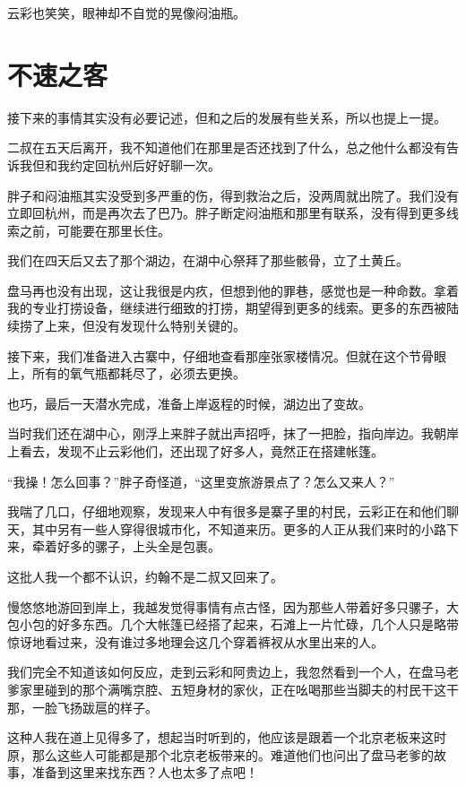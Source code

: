 云彩也笑笑，眼神却不自觉的晃像闷油瓶。

\chapter{不速之客}

接下来的事情其实没有必要记述，但和之后的发展有些关系，所以也提上一提。

二叔在五天后离开，我不知道他们在那里是否还找到了什么，总之他什么都没有告诉我但和我约定回杭州后好好聊一次。

胖子和闷油瓶其实没受到多严重的伤，得到救治之后，没两周就出院了。我们没有立即回杭州，而是再次去了巴乃。胖子断定闷油瓶和那里有联系，没有得到更多线索之前，可能要在那里长住。

我们在四天后又去了那个湖边，在湖中心祭拜了那些骸骨，立了土黄丘。

盘马再也没有出现，这让我很是内疚，但想到他的罪巷，感觉也是一种命数。拿着我的专业打捞设备，继续进行细致的打捞，期望得到更多的线索。更多的东西被陆续捞了上来，但没有发现什么特别关键的。

接下来，我们准备进入古寨中，仔细地查看那座张家楼情况。但就在这个节骨眼上，所有的氧气瓶都耗尽了，必须去更换。

也巧，最后一天潜水完成，准备上岸返程的时候，湖边出了变故。

当时我们还在湖中心，刚浮上来胖子就出声招呼，抹了一把脸，指向岸边。我朝岸上看去，发现不止云彩他们，还出现了好多人，竟然正在搭建帐篷。

“我操！怎么回事？”胖子奇怪道，“这里变旅游景点了？怎么又来人？”

我喘了几口，仔细地观察，发现来人中有很多是寨子里的村民，云彩正在和他们聊天，其中另有一些人穿得很城市化，不知道来历。更多的人正从我们来时的小路下来，牵着好多的骡子，上头全是包裹。

这批人我一个都不认识，约翰不是二叔又回来了。

慢悠悠地游回到岸上，我越发觉得事情有点古怪，因为那些人带着好多只骡子，大包小包的好多东西。几个大帐篷已经搭了起来，石滩上一片忙碌，几个人只是略带惊讶地看过来，没有谁过多地理会这几个穿着裤衩从水里出来的人。

我们完全不知道该如何反应，走到云彩和阿贵边上，我忽然看到一个人，在盘马老爹家里碰到的那个满嘴京腔、五短身材的家伙，正在吆喝那些当脚夫的村民干这干那，一脸飞扬跋扈的样子。

这种人我在道上见得多了，想起当时听到的，他应该是跟着一个北京老板来这时原，那么这些人可能都是那个北京老板带来的。难道他们也问出了盘马老爹的故事，准备到这里来找东西？人也太多了点吧！

